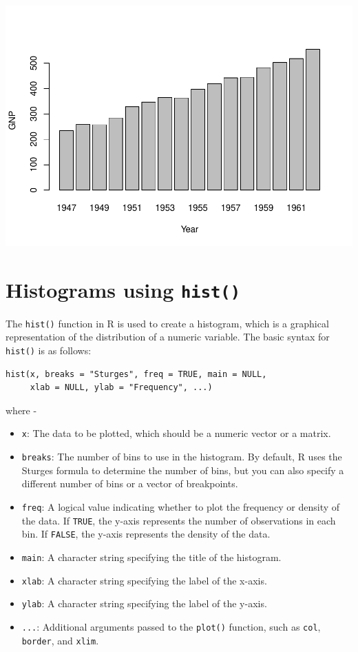 \documentclass[
]{book}
\providecommand{\tightlist}{%
  \setlength{\itemsep}{0pt}\setlength{\parskip}{0pt}}
\begin{document}
\begin{center}\includegraphics[height=0.55\textheight]{DauR_files/figure-latex/p10-1} \end{center}

\hypertarget{histograms-using-hist}{%
\section{\texorpdfstring{Histograms using \texttt{hist()}}{Histograms using hist()}}\label{histograms-using-hist}}

The \texttt{hist()} function in R is used to create a histogram, which is a graphical representation of the distribution of a numeric variable. The basic syntax for \texttt{hist()} is as follows:

\begin{verbatim}
hist(x, breaks = "Sturges", freq = TRUE, main = NULL,
     xlab = NULL, ylab = "Frequency", ...)
\end{verbatim}

where -

\begin{itemize}
\tightlist
\item
  \texttt{x}: The data to be plotted, which should be a numeric vector or a matrix.
\item
  \texttt{breaks}: The number of bins to use in the histogram. By default, R uses the Sturges formula to determine the number of bins, but you can also specify a different number of bins or a vector of breakpoints.
\item
  \texttt{freq}: A logical value indicating whether to plot the frequency or density of the data. If \texttt{TRUE}, the y-axis represents the number of observations in each bin. If \texttt{FALSE}, the y-axis represents the density of the data.
\item
  \texttt{main}: A character string specifying the title of the histogram.
\item
  \texttt{xlab}: A character string specifying the label of the x-axis.
\item
  \texttt{ylab}: A character string specifying the label of the y-axis.
\item
  \texttt{...}: Additional arguments passed to the \texttt{plot()} function, such as \texttt{col}, \texttt{border}, and \texttt{xlim}.
\end{itemize}
\end{document}
